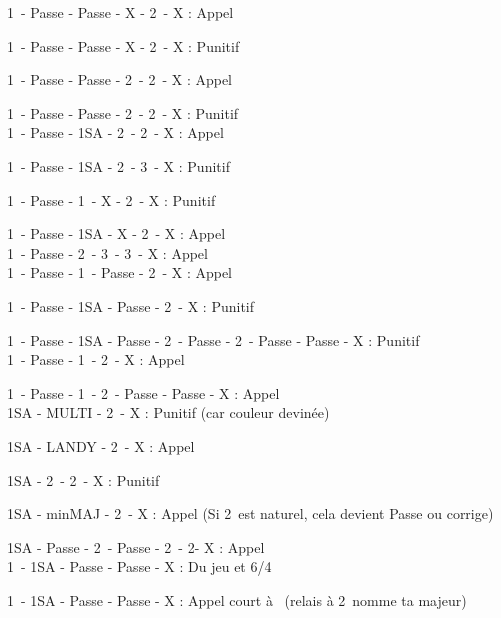 \documentclass[a4paper, oneside, 11pt]{report}
\begin{document}
		1\pique\ - Passe - Passe - X - 2\pique\ - X : Appel
		
		1\pique\ - Passe - Passe - X - 2\trefle\ - X : Punitif
		
		1\pique\ - Passe - Passe - 2\coeur\ - 2\pique\ - X : Appel
		
		1\pique\ - Passe - Passe - 2\carreau\ - 2\coeur\ - X : Punitif\\
		
		1\pique\ - Passe - 1SA - 2\coeur\ - 2\pique\ - X : Appel
		
		1\pique\ - Passe - 1SA - 2\coeur\ - 3\carreau\ - X : Punitif
		
		1\carreau\ - Passe - 1\coeur\ - X - 2\carreau\ - X : Punitif
		
		1\carreau\ - Passe - 1SA - X - 2\carreau\ - X : Appel\\
		
		1\coeur\ - Passe - 2\coeur\ - 3\carreau\ - 3\coeur\ - X : Appel\\
		
		1\coeur\ - Passe - 1\pique\ - Passe - 2\coeur\ - X : Appel
		
		1\coeur\ - Passe - 1SA - Passe - 2\coeur\ - X : Punitif
		
		1\coeur\ - Passe - 1SA - Passe - 2\trefle\ - Passe - 2\coeur\ - Passe - Passe - X : Punitif\\
		
		1\carreau\ - Passe - 1\coeur\ - 2\coeur\ - X : Appel
		
		1\carreau\ - Passe - 1\coeur\ - 2\coeur\ - Passe - Passe - X : Appel\\
		
		1SA - MULTI - 2\coeur\ - X : Punitif (car couleur devinée)
		
		1SA - LANDY - 2\carreau\ - X : Appel
		
		1SA - 2\coeur\ - 2\pique\ - X : Punitif
		
		1SA - minMAJ - 2\trefle\ - X : Appel (Si 2\trefle\ est naturel, cela devient Passe ou corrige)
		
		1SA - Passe - 2\carreau\ - Passe - 2\coeur\ - 2\pique - X : Appel\\
		
		
		
		1\coeur\ - 1SA - Passe - Passe - X : Du jeu et 6\coeur/4\pique
		
		1\trefle\ - 1SA - Passe - Passe - X : Appel court à \carreau\ (relais à 2\carreau\ nomme ta majeur)
\end{document}
